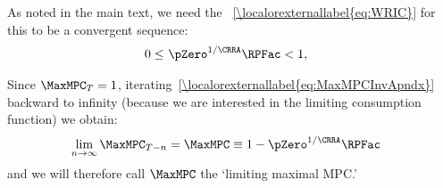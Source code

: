 \documentclass[\econtexRoot/BufferStockTheory]{subfiles}
\begin{document}
As noted in the main text, we need the \WRIC~\eqref{\localorexternallabel{eq:WRIC}} for this to be a convergent sequence:
\begin{equation}\begin{gathered}\begin{aligned}
  0 \leq & ~\pZero^{1/\CRRA} \RPFac < 1 \label{eq:WRICapndx},
\end{aligned}\end{gathered}\end{equation}

Since $\MaxMPC_{T}=1$, iterating~\eqref{\localorexternallabel{eq:MaxMPCInvApndx}} backward to
infinity (because we are interested in the limiting consumption function) we obtain:
\begin{equation}\begin{gathered}\begin{aligned}
\lim_{n\rightarrow\infty}\MaxMPC_{T-n} 
& = \MaxMPC \equiv 1-\pZero^{1/\CRRA}\RPFac  \label{eq:MaxMPCDef}
\end{aligned}\end{gathered}\end{equation}
and we will therefore call $\MaxMPC$ the `limiting maximal MPC.'
\end{document}

